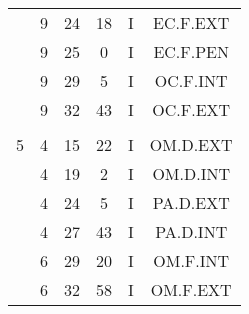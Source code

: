 \documentclass[12pt, a4paper]{article}
\begin{document}
\begin{multicols}{3}
{\begin{tabular}{c c c c c c}
	 	 	 	 & 9 & 24 & 18 & I & EC.F.EXT\\%
	 	 	 	 & 9 & 25 & 0 & I & EC.F.PEN\\%
	 	 	 	 & 9 & 29 & 5 & I & OC.F.INT\\%
	 	 	 	 & 9 & 32 & 43 & I & OC.F.EXT\\%
	 	 	 	 & & & & & \\%
	 	 	 	5 & 4 & 15 & 22 & I & OM.D.EXT\\%
	 	 	 	 & 4 & 19 & 2 & I & OM.D.INT\\%
	 	 	 	 & 4 & 24 & 5 & I & PA.D.EXT\\%
	 	 	 	 & 4 & 27 & 43 & I & PA.D.INT\\%
	 	 	 	 & 6 & 29 & 20 & I & OM.F.INT\\%
	 	 	 	 & 6 & 32 & 58 & I & OM.F.EXT\\%
	 	 \end{tabular}
 	}
\end{multicols}
\end{document}
